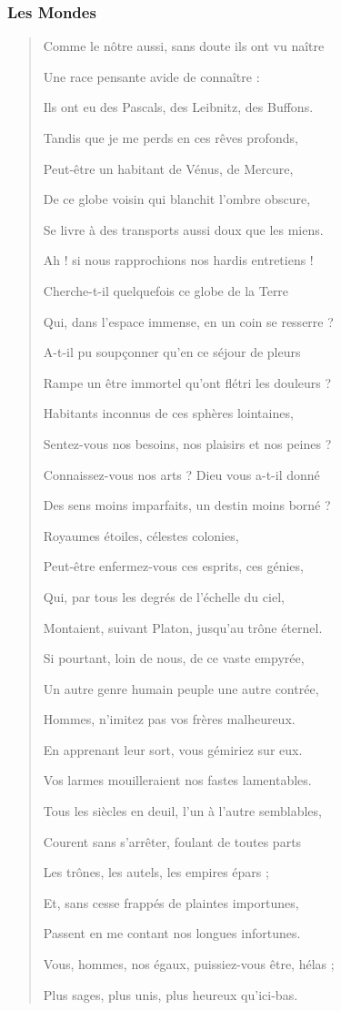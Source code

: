 \documentclass[a4paper, 11pt, oneside]{article}
\begin{document}
\subsubsection{Les Mondes}
\begin{quotation}
Comme le nôtre aussi, sans doute ils ont vu naître

Une race pensante avide de connaître :

Ils ont eu des Pascals, des Leibnitz, des Buffons.

Tandis que je me perds en ces rêves profonds,

Peut-être un habitant de Vénus, de Mercure,

De ce globe voisin qui blanchit l'ombre obscure,

Se livre à des transports aussi doux que les miens.

Ah ! si nous rapprochions nos hardis entretiens !

Cherche-t-il quelquefois ce globe de la Terre

Qui, dans l'espace immense, en un coin se resserre ?

A-t-il pu soupçonner qu'en ce séjour de pleurs

Rampe un être immortel qu'ont flétri les douleurs ?

Habitants inconnus de ces sphères lointaines,

Sentez-vous nos besoins, nos plaisirs et nos peines ?

Connaissez-vous nos arts ? Dieu vous a-t-il donné

Des sens moins imparfaits, un destin moins borné ?

Royaumes étoiles, célestes colonies,

Peut-être enfermez-vous ces esprits, ces génies,

Qui, par tous les degrés de l'échelle du ciel,

Montaient, suivant Platon, jusqu'au trône éternel.

Si pourtant, loin de nous, de ce vaste empyrée,

Un autre genre humain peuple une autre contrée,

Hommes, n'imitez pas vos frères malheureux.

En apprenant leur sort, vous gémiriez sur eux.

Vos larmes mouilleraient nos fastes lamentables.

Tous les siècles en deuil, l'un à l'autre semblables,

Courent sans s'arrêter, foulant de toutes parts

Les trônes, les autels, les empires épars ;

Et, sans cesse frappés de plaintes importunes,

Passent en me contant nos longues infortunes.

Vous, hommes, nos égaux, puissiez-vous être, hélas ;

Plus sages, plus unis, plus heureux qu'ici-bas.
\end{quotation}
\clearpage
\end{document}
